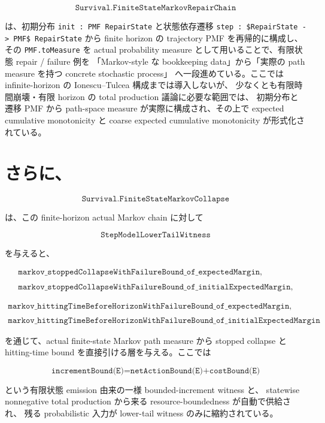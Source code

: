 \documentclass[12pt,a4paper]{article}
\begin{document}
\[
\texttt{Survival.FiniteStateMarkovRepairChain}
\]

は、初期分布 \texttt{init\ :\ PMF\ RepairState} と状態依存遷移 \texttt{step\ :\ \$RepairState\ -\textgreater{}\ PMF\$\ RepairState} から finite horizon の trajectory PMF を再帰的に構成し、その \texttt{PMF.toMeasure} を actual probability measure として用いることで、有限状態 repair / failure 例を 「Markov-style な bookkeeping data」から「実際の path measure を持つ concrete stochastic process」 へ一段進めている。ここでは infinite-horizon の Ionescu--Tulcea 構成までは導入しないが、 少なくとも有限時間崩壊・有限 horizon の total production 議論に必要な範囲では、 初期分布と遷移 PMF から path-space measure が実際に構成され、その上で expected cumulative monotonicity と coarse expected cumulative monotonicity が形式化されている。

\section{さらに、}\label{ux3055ux3089ux306b}

\[
\texttt{Survival.FiniteStateMarkovCollapse}
\]

は、この finite-horizon actual Markov chain に対して

\[
\texttt{StepModelLowerTailWitness}
\]

を与えると、

\[
\begin{aligned}
\texttt{markov\_stoppedCollapseWithFailureBound\_of\_expectedMargin}, \\
\qquad \\
\texttt{markov\_stoppedCollapseWithFailureBound\_of\_initialExpectedMargin},
\end{aligned}
\]

\[
\begin{aligned}
\texttt{markov\_hittingTimeBeforeHorizonWithFailureBound\_of\_expectedMargin}, \\
\qquad \\
\texttt{markov\_hittingTimeBeforeHorizonWithFailureBound\_of\_initialExpectedMargin}
\end{aligned}
\]

を通じて、actual finite-state Markov path measure から stopped collapse と hitting-time bound を直接引ける層を与える。ここでは

\[
\texttt{incrementBound(E)=netActionBound(E)+costBound(E)}
\]

という有限状態 emission 由来の一様 bounded-increment witness と、 statewise nonnegative total production から来る resource-boundedness が自動で供給され、 残る probabilistic 入力が lower-tail witness のみに縮約されている。
\end{document}
